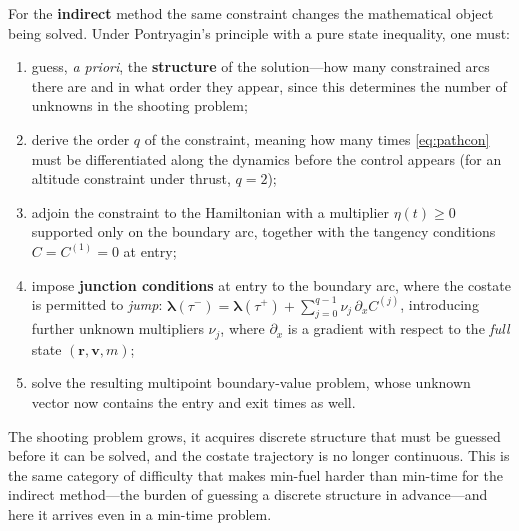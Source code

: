 \documentclass[11pt]{article}
\newcommand{\vecr}{\mathbf{r}}
\newcommand{\vecv}{\mathbf{v}}
\begin{document}
For the \textbf{indirect} method the same constraint changes the mathematical
object being solved. Under Pontryagin's principle with a pure state
inequality, one must:
\begin{enumerate}
  \item guess, \emph{a priori}, the \textbf{structure} of the solution---how
        many constrained arcs there are and in what order they appear, since
        this determines the number of unknowns in the shooting problem;
  \item derive the order $q$ of the constraint, meaning how many times
        \eqref{eq:pathcon} must be differentiated along the dynamics before the
        control appears (for an altitude constraint under thrust, $q = 2$);
  \item adjoin the constraint to the Hamiltonian with a multiplier
        $\eta(t) \ge 0$ supported only on the boundary arc, together with the
        tangency conditions $C = C^{(1)} = 0$ at entry;
  \item impose \textbf{junction conditions} at entry to the boundary arc, where
        the costate is permitted to \emph{jump}:
        $\boldsymbol{\lambda}(\tau^-) = \boldsymbol{\lambda}(\tau^+) +
        \sum_{j=0}^{q-1}\nu_j \,\partial_x C^{(j)}$, introducing further unknown
        multipliers $\nu_j$, where $\partial_x$ is a gradient with respect to the
        \emph{full} state $(\vecr,\vecv,m)$;
  \item solve the resulting multipoint boundary-value problem, whose unknown
        vector now contains the entry and exit times as well.
\end{enumerate}
The shooting problem grows, it acquires discrete structure that must be guessed
before it can be solved, and the costate trajectory is no longer continuous.
This is the same category of difficulty that makes min-fuel harder than
min-time for the indirect method---the burden of guessing a discrete structure
in advance---and here it arrives even in a min-time problem.
\end{document}
